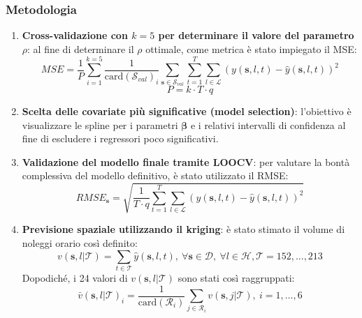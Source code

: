 \begin{frame}
	\frametitle{Metodologia}
	\centering
	\begin{enumerate}
		\justifying
		\item \textbf{Cross-validazione con $k=5$ per determinare il valore del parametro $\rho$}: al fine di determinare il $\rho$ ottimale, come metrica è stato impiegato il MSE:
		\begin{equation*}
			MSE = \frac{1}{P}\sum_{i=1}^{k=5}\frac{1}{\text{card}(\mathcal{S}_{val})_i}\sum_{\mathbf{s}\in\mathcal{S}_{val}}^{}\sum_{t=1}^{T}\sum_{l\in\mathcal{L}}^{} (y(\mathbf{s}, l, t) - \hat{y}(\mathbf{s}, l, t))^2
		\end{equation*}
		\begin{equation*}
			P = k\cdot T\cdot q
		\end{equation*}
		\item \textbf{Scelta delle covariate più significative (model selection)}: l'obiettivo è visualizzare le spline per i parametri $\boldsymbol{\beta}$ e i relativi intervalli di confidenza al fine di escludere i regressori poco significativi.

	\end{enumerate}	
\end{frame}
\begin{frame}
	\centering
	
	\begin{enumerate}
		\setcounter{enumi}{2}
		\justifying
		\item \textbf{Validazione del modello finale tramite LOOCV}: per valutare la bontà complessiva del modello definitivo, è stato utilizzato il RMSE:
		\begin{equation*}
			RMSE_\mathbf{s} = \sqrt{\frac{1}{T\cdot q}\sum_{t=1}^{T}\sum_{l\in\mathcal{L}}^{} (y(\mathbf{s}, l, t) - \hat{y}(\mathbf{s}, l, t))^2}
		\end{equation*}
		\item \textbf{Previsione spaziale utilizzando il kriging}: è stato stimato il volume di noleggi orario così definito:
		\begin{equation*}
			v(\mathbf{s}, l|\mathcal{T}) = \sum_{t\in\mathcal{T}} \hat{y}(\mathbf{s}, l, t), \ \forall \mathbf{s}\in\mathcal{D}, \ \forall l\in\mathcal{H}, \mathcal{T} = 152,\dots,213
		\end{equation*}
			Dopodiché, i \num{24} valori di $v(\mathbf{s}, l|\mathcal{T})$ sono stati così raggruppati:
		\begin{equation*}
			\bar{v}(\mathbf{s}, l|\mathcal{T})_i = \frac{1}{\text{card}(\mathcal{R}_i)}\sum_{j\in\mathcal{R}_i}^{}v(\mathbf{s}, j|\mathcal{T}), \ i=1,\dots, 6
		\end{equation*}
	\end{enumerate}	
\end{frame}

